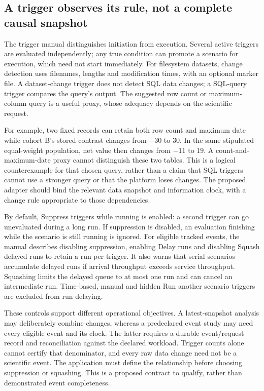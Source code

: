 \subsection{A trigger observes its rule, not a complete causal snapshot}

The trigger manual distinguishes initiation from execution. Several active
triggers are evaluated independently; any true condition can promote a scenario
for execution, which need not start immediately. For filesystem datasets,
change detection uses filenames, lengths and modification times, with an
optional marker file. A dataset-change trigger does not detect SQL data
changes; a SQL-query trigger compares the query's output. The suggested row
count or maximum-column query is a useful proxy, whose adequacy depends on the
scientific request.~\citep{exec23_dss_latest_triggers}

For example, two fixed records can retain both row count and maximum date
while cohort B's stored contrast changes from $-30$ to $30$. In the same
stipulated equal-weight population, net value then changes from $-11$ to $19$.
A count-and-maximum-date proxy cannot distinguish these two tables. This is a
logical counterexample for that chosen query, rather than a claim that SQL
triggers cannot use a stronger query or that the platform loses changes.
The proposed adapter should bind the relevant data snapshot and information
clock, with a change rule appropriate to those dependencies.
\citep{exec23_dss_denominator_reference}

By default, Suppress triggers while running is enabled: a second trigger can
go unevaluated during a long run. If suppression is disabled, an evaluation
finishing while the scenario is still running is ignored. For eligible tracked
events, the manual describes disabling suppression, enabling Delay runs and
disabling Squash delayed runs to retain a run per trigger. It also warns that
serial scenarios accumulate delayed runs if arrival throughput exceeds service
throughput. Squashing limits the delayed queue to at most one run and can
cancel an intermediate run. Time-based, manual and hidden Run another scenario
triggers are excluded from run delaying.
\citep{exec23_dss_latest_triggers}

These controls support different operational objectives. A latest-snapshot
analysis may deliberately combine changes, whereas a predeclared event study
may need every eligible event and its clock. The latter requires a durable
event/request record and reconciliation against the declared workload.
Trigger counts alone cannot certify that denominator, and every raw data
change need not be a scientific event. The application must define the
relationship before choosing suppression or squashing. This is a proposed
contract to qualify, rather than demonstrated event completeness.

